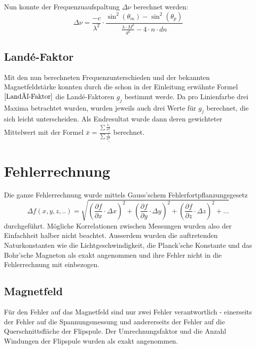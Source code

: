 \documentclass[a4paper,parskip,11pt, DIV12]{scrreprt}
\begin{document}
Nun konnte der Frequenzuaufspaltung $\Delta \nu$ berechnet werden:
	\begin{equation}
	\label{Frequenzunterschied}
	\Delta \nu = \frac{-c}{\lambda^2}\cdot\frac{\sin^2(\theta_m)-\sin^2(\theta_p)}{\frac{\lambda \cdot M^2}{d^2}-4\cdot n \cdot dn}
	\end{equation}
	
	\section{Landé-Faktor}
	
	Mit den nun berechneten Frequenzunterschieden und der bekannten Magnetfeldstärke konnten durch die schon in der Einleitung erwähnte Formel $\eqref{Landé-Faktor}$ die Landé-Faktoren $g_j$ bestimmt werde. Da pro Linienfarbe drei Maxima betrachtet wurden, wurden jeweils auch drei Werte für $g_j$ berechnet, die sich leicht unterscheiden. Als Endresultat wurde dann deren gewichteter Mittelwert mit der Formel  $\bar{x} = \frac{\sum\frac{x_i}{\sigma_i^2}}{\sum \frac{1}{\sigma_i^2}}$ berechnet. 
 
	 
	\chapter{Fehlerrechnung}
	Die ganze Fehlerrechnung wurde mittels Gauss'schem Fehlerfortpflanzungsgesetz 
	\begin{equation}
	\label{Fehlerfortpflanzungsgesetz}
	\Delta f(x,y,z,..) = \sqrt{(\frac{\partial f}{\partial x} \cdot \Delta x)^2+(\frac{\partial f}{\partial y} \cdot \Delta y)^2+(\frac{\partial f}{\partial z} \cdot \Delta z)^2+...}
	\end{equation}
	durchgeführt. Mögliche Korrelationen zwischen Messungen wurden also der Einfachheit halber nicht beachtet. Ausserdem wurden die auftretenden Naturkonstanten wie die Lichtgeschwindigkeit, die Planck'sche Konstante und das Bohr'sche Magneton als exakt angenommen und ihre Fehler nicht in die Fehlerrechnung mit einbezogen.  
	\section{Magnetfeld}
	Für den Fehler auf das Magnetfeld sind nur zwei Fehler verantwortlich - einerseits der Fehler auf die Spannungsmessung und andererseits der Fehler auf die Querschnittsfläche der Flipspule. Der Umrechnungsfaktor und die Anzahl Windungen der Flipspule wurden als exakt angenommen. 
	
\end{document}
